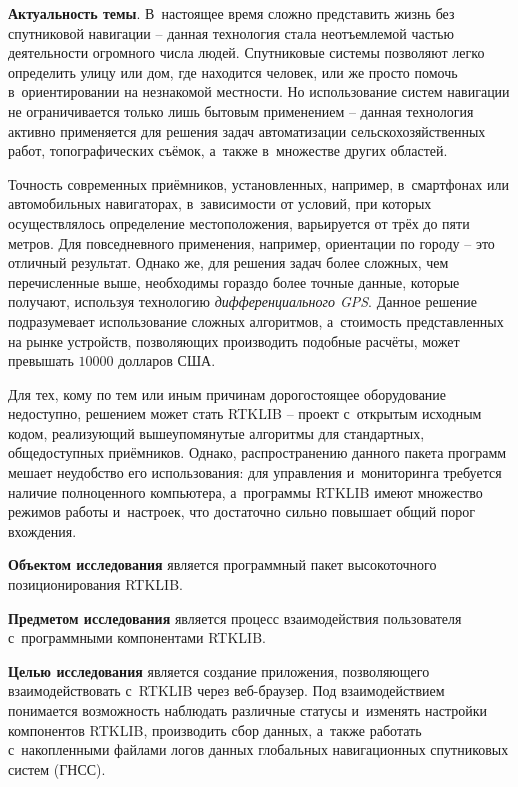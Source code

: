 
\textbf{Актуальность темы}. В~настоящее время сложно представить жизнь без спутниковой навигации -- данная технология стала неотъемлемой частью деятельности огромного числа людей. Спутниковые системы позволяют легко определить улицу или дом, где находится человек, или же просто помочь в~ориентировании на незнакомой местности. Но использование систем навигации не ограничивается только лишь бытовым применением -- данная технология активно применяется для решения задач автоматизации сельскохозяйственных работ, топографических съёмок, а~также в~множестве других областей. \par

Точность современных приёмников, установленных, например, в~смартфонах или автомобильных навигаторах, в~зависимости от условий, при которых осуществлялось определение местоположения, варьируется от трёх до пяти метров. Для повседневного применения, например, ориентации по городу -- это отличный результат. Однако же, для решения задач более сложных, чем перечисленные выше, необходимы гораздо более точные данные, которые получают, используя технологию \textit{дифференциального GPS}. Данное решение подразумевает использование сложных алгоритмов, а~стоимость представленных на рынке устройств, позволяющих производить подобные расчёты, может превышать $10000$ долларов США. \par

Для тех, кому по тем или иным причинам дорогостоящее оборудование недоступно, решением может стать RTKLIB -- проект с~открытым исходным кодом, реализующий вышеупомянутые алгоритмы для стандартных, общедоступных приёмников. Однако, распространению данного пакета программ мешает неудобство его использования: для управления и~мониторинга требуется наличие полноценного компьютера, а~программы RTKLIB имеют множество режимов работы и~настроек, что достаточно сильно повышает общий порог вхождения. \par

\textbf{Объектом исследования} является программный пакет высокоточного позиционирования RTKLIB. \par

\textbf{Предметом исследования} является процесс взаимодействия пользователя с~программными компонентами RTKLIB. \par

\textbf{Целью исследования} является создание приложения, позволяющего взаимодействовать с~RTKLIB через веб-браузер. Под взаимодействием понимается возможность наблюдать различные статусы и~изменять настройки компонентов RTKLIB, производить сбор данных, а~также работать с~накопленными файлами логов данных глобальных навигационных спутниковых систем (ГНСС). \par

